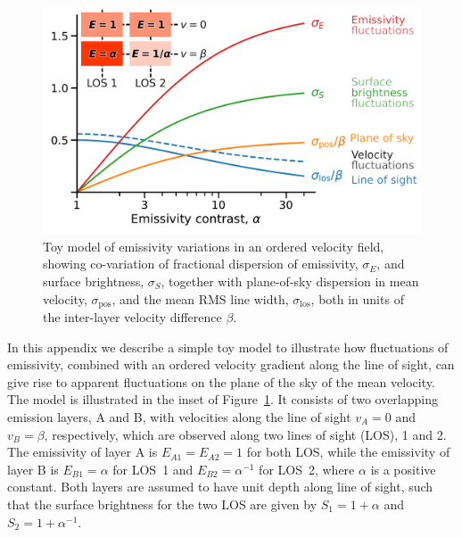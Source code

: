 \documentclass[fleqn,usenatbib, useAMS, a4paper]{mnras}
\newcommand\pos{\ensuremath{_{\mathrm{pos}}}}
\newcommand\los{\ensuremath{_{\mathrm{los}}}}
\begin{document}
\begin{figure}
  \centering
  \includegraphics[width=\linewidth]{Figures/bright-to-vel-fluct-annotated}
  \caption{
    Toy model of emissivity variations in an ordered velocity field,
    showing co-variation of fractional dispersion of
    emissivity, \(\sigma_E\), and surface brightness, \(\sigma_S\),
    together with plane-of-sky dispersion in mean velocity,
    \(\sigma\pos\),
    and the mean RMS line width, \(\sigma\los\),
    both in units of the inter-layer velocity difference \(\beta\).
  }
  \label{fig:bright-to-vel-fluct}
\end{figure}

In this appendix we describe a simple toy model to illustrate
how fluctuations of emissivity,
combined with an ordered velocity gradient along the line of sight,
can give rise to apparent fluctuations on the plane of the sky
of the mean velocity.
The model is illustrated in the inset of Figure~\ref{fig:bright-to-vel-fluct}.
It consists of two overlapping emission layers, A and B,
with velocities along the line of sight \(v_A = 0\) and \(v_B = \beta\), respectively,
which are observed along two lines of sight (LOS), 1 and 2.
The emissivity of layer A is \(E_{A1} = E_{A2} = 1\) for both LOS,
while the emissivity of layer B is \(E_{B1} = \alpha\) for LOS~1
and \(E_{B2} = \alpha^{-1}\) for LOS~2, where \(\alpha\) is a positive constant.
Both layers are assumed to have unit depth along line of sight,
such that the surface brightness for the two LOS are given by
\(S_1 = 1 + \alpha\) and \(S_2 = 1 + \alpha^{-1}\).
\end{document}
